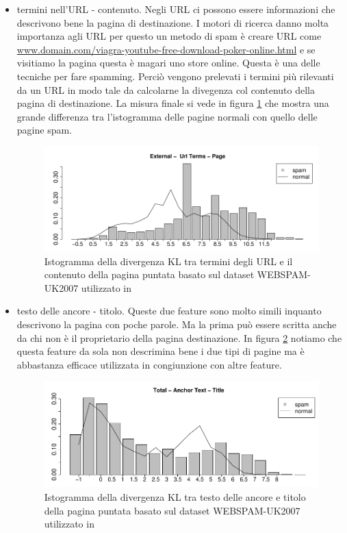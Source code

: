 \begin{itemize}
\item termini nell'URL - contenuto. Negli URL ci possono essere informazioni che descrivono bene la pagina di destinazione. I motori di ricerca danno molta importanza agli URL per questo un metodo di spam è creare URL come \url{www.domain.com/viagra-youtube-free-download-poker-online.html} e se visitiamo la pagina questa è magari uno store online. Questa è una delle tecniche per fare spamming. Perciò vengono prelevati i termini più rilevanti da un URL in modo tale da calcolarne la divegenza col contenuto della pagina di destinazione. La misura finale si vede in figura \ref{fig:martinez3} che mostra una grande differenza tra l'istogramma delle pagine normali con quello delle pagine spam.
\begin{figure}[htbp]
\centering
\includegraphics[width=12cm]{immagini/martinez/martinez3}
\caption{Istogramma della divergenza KL tra termini degli URL e il contenuto della pagina puntata basato sul dataset WEBSPAM-UK2007 utilizzato in \cite{Martinez-Romo:2009:WSI:1531914.1531920}}
\label{fig:martinez3}
\end{figure}

\item testo delle ancore - titolo. Queste due feature sono molto simili inquanto descrivono la pagina con poche parole. Ma la prima può essere scritta anche da chi non è il proprietario della pagina destinazione.  In figura \ref{fig:martinez4} notiamo che questa feature da sola non descrimina bene i due tipi di pagine ma è abbastanza efficace utilizzata in congiunzione con altre feature.
\begin{figure}[htbp]
\centering
\includegraphics[width=12cm]{immagini/martinez/martinez4}
\caption{Istogramma della divergenza KL tra testo delle ancore e titolo della pagina puntata basato sul dataset WEBSPAM-UK2007 utilizzato in \cite{Martinez-Romo:2009:WSI:1531914.1531920}}
\label{fig:martinez4}
\end{figure}


\end{itemize}
